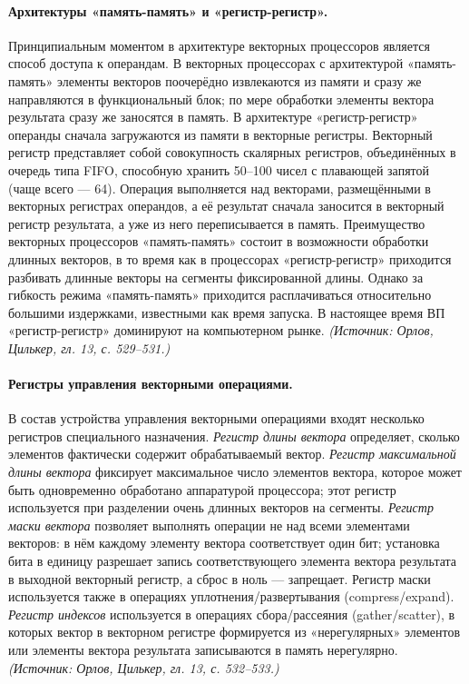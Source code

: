 \documentclass[a4paper,12pt]{article}
\begin{document}
\paragraph{Архитектуры «память-память» и «регистр-регистр».}
Принципиальным моментом в архитектуре векторных процессоров является способ доступа к операндам. В векторных процессорах с архитектурой «память-память» элементы векторов поочерёдно извлекаются из памяти и сразу же направляются в функциональный блок; по мере обработки элементы вектора результата сразу же заносятся в память. В архитектуре «регистр-регистр» операнды сначала загружаются из памяти в векторные регистры. Векторный регистр представляет собой совокупность скалярных регистров, объединённых в очередь типа FIFO, способную хранить 50--100 чисел с плавающей запятой (чаще всего --- 64). Операция выполняется над векторами, размещёнными в векторных регистрах операндов, а её результат сначала заносится в векторный регистр результата, а уже из него переписывается в память. Преимущество векторных процессоров «память-память» состоит в возможности обработки длинных векторов, в то время как в процессорах «регистр-регистр» приходится разбивать длинные векторы на сегменты фиксированной длины. Однако за гибкость режима «память-память» приходится расплачиваться относительно большими издержками, известными как время запуска. В настоящее время ВП «регистр-регистр» доминируют на компьютерном рынке.
\textit{(Источник: Орлов, Цилькер, гл. 13, с. 529--531.)}

\paragraph{Регистры управления векторными операциями.}
В состав устройства управления векторными операциями входят несколько регистров специального назначения. \emph{Регистр длины вектора} определяет, сколько элементов фактически содержит обрабатываемый вектор. \emph{Регистр максимальной длины вектора} фиксирует максимальное число элементов вектора, которое может быть одновременно обработано аппаратурой процессора; этот регистр используется при разделении очень длинных векторов на сегменты. \emph{Регистр маски вектора} позволяет выполнять операции не над всеми элементами векторов: в нём каждому элементу вектора соответствует один бит; установка бита в единицу разрешает запись соответствующего элемента вектора результата в выходной векторный регистр, а сброс в ноль --- запрещает. Регистр маски используется также в операциях уплотнения/развертывания (compress/expand). \emph{Регистр индексов} используется в операциях сбора/рассеяния (gather/scatter), в которых вектор в векторном регистре формируется из «нерегулярных» элементов или элементы вектора результата записываются в память нерегулярно.
\textit{(Источник: Орлов, Цилькер, гл. 13, с. 532--533.)}
\end{document}
